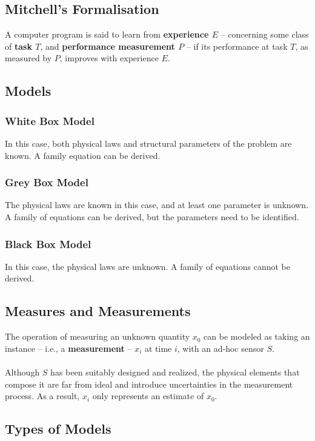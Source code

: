 \documentclass{article}
\begin{document}
\subsection{Mitchell's Formalisation}
A computer program is said to learn from \textbf{experience $E$} -- concerning some class of \textbf{task $T$}, and \textbf{performance measurement $P$} -- if its performance at task $T$, as measured by $P$, improves with experience $E$.

\subsection{Models}
\subsubsection{White Box Model}
In this case, both physical laws and structural parameters of the problem are known. A family equation can be derived.

\subsubsection{Grey Box Model}
The physical laws are known in this case, and at least one parameter is unknown. A family of equations can be derived, but the parameters need to be identified.

\subsubsection{Black Box Model}
In this case, the physical laws are unknown. A family of equations cannot be derived.

\subsection{Measures and Measurements}
The operation of measuring an unknown quantity $x_0$ can be modeled as taking an instance -- i.e., a \textbf{measurement} -- $x_i$ at time $i$, with an ad-hoc sensor $S$. \\ \\
Although $S$ has been suitably designed and realized, the physical elements that compose it are far from ideal and introduce uncertainties in the measurement process. As a result, $x_i$ only represents an estimate of $x_0$.

\subsection{Types of Models}
\end{document}
